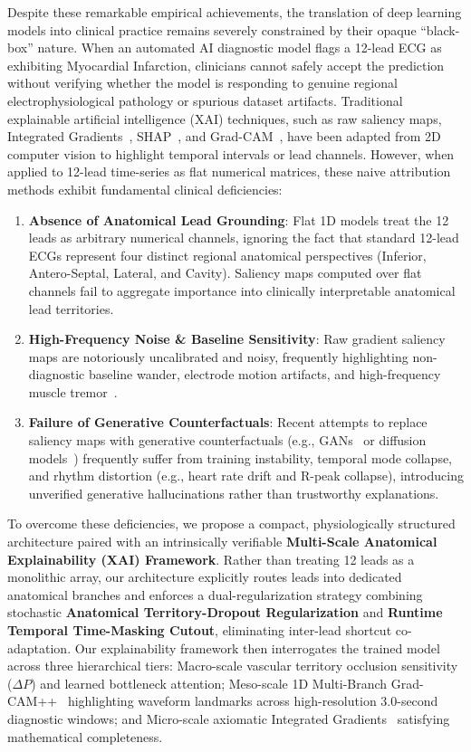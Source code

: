 \documentclass[12pt]{elsarticle}
\begin{document}
Despite these remarkable empirical achievements, the translation of deep learning models into clinical practice remains severely constrained by their opaque ``black-box'' nature. When an automated AI diagnostic model flags a 12-lead ECG as exhibiting Myocardial Infarction, clinicians cannot safely accept the prediction without verifying whether the model is responding to genuine regional electrophysiological pathology or spurious dataset artifacts. Traditional explainable artificial intelligence (XAI) techniques, such as raw saliency maps, Integrated Gradients~\cite{sundararajan2017axiomatic}, SHAP~\cite{lundberg2017unified}, and Grad-CAM~\cite{selvaraju2017grad}, have been adapted from 2D computer vision to highlight temporal intervals or lead channels. However, when applied to 12-lead time-series as flat numerical matrices, these naive attribution methods exhibit fundamental clinical deficiencies:
\begin{enumerate}
    \item \textbf{Absence of Anatomical Lead Grounding}: Flat 1D models treat the 12 leads as arbitrary numerical channels, ignoring the fact that standard 12-lead ECGs represent four distinct regional anatomical perspectives (Inferior, Antero-Septal, Lateral, and Cavity). Saliency maps computed over flat channels fail to aggregate importance into clinically interpretable anatomical lead territories.
    \item \textbf{High-Frequency Noise \& Baseline Sensitivity}: Raw gradient saliency maps are notoriously uncalibrated and noisy, frequently highlighting non-diagnostic baseline wander, electrode motion artifacts, and high-frequency muscle tremor~\cite{ismail2020benchmarking, tonekaboni2020went}.
    \item \textbf{Failure of Generative Counterfactuals}: Recent attempts to replace saliency maps with generative counterfactuals (e.g., GANs~\cite{korkmaz2021deep} or diffusion models~\cite{neifar2024diffecg}) frequently suffer from training instability, temporal mode collapse, and rhythm distortion (e.g., heart rate drift and R-peak collapse), introducing unverified generative hallucinations rather than trustworthy explanations.
\end{enumerate}

To overcome these deficiencies, we propose a compact, physiologically structured architecture paired with an intrinsically verifiable \textbf{Multi-Scale Anatomical Explainability (XAI) Framework}. Rather than treating 12 leads as a monolithic array, our architecture explicitly routes leads into dedicated anatomical branches and enforces a dual-regularization strategy combining stochastic \textbf{Anatomical Territory-Dropout Regularization} and \textbf{Runtime Temporal Time-Masking Cutout}, eliminating inter-lead shortcut co-adaptation. Our explainability framework then interrogates the trained model across three hierarchical tiers: Macro-scale vascular territory occlusion sensitivity ($\Delta P$) and learned bottleneck attention; Meso-scale 1D Multi-Branch Grad-CAM++~\cite{chattopadhay2018grad} highlighting waveform landmarks across high-resolution 3.0-second diagnostic windows; and Micro-scale axiomatic Integrated Gradients~\cite{sundararajan2017axiomatic} satisfying mathematical completeness.
\end{document}
